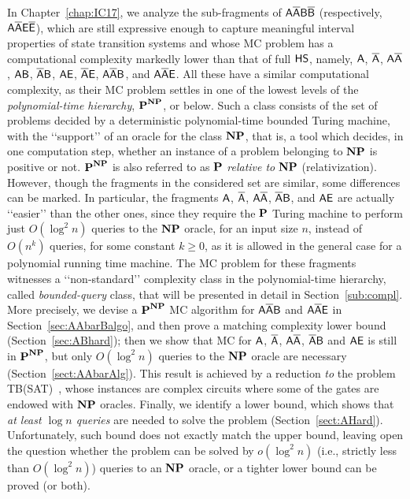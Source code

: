In Chapter~\ref{chap:IC17}, we analyze the sub-fragments of $\mathsf{A\overline{A}B\overline{B}}$ (respectively, $\mathsf{A\overline{A}E\overline{E}}$), which are still expressive enough to capture meaningful interval properties of state transition systems and whose MC problem has a computational complexity markedly lower than that of full $\text{\sffamily HS}$,
namely, $\mathsf{A}$, $\mathsf{\overline{A}}$, $\mathsf{A\overline{A}}$, $\mathsf{AB}$, $\mathsf{\overline{A}B}$, $\mathsf{AE}$, $\mathsf{\overline{A}E}$, $\mathsf{A\overline{A}B}$, and  $\mathsf{A\overline{A}E}$.
All these have a similar computational complexity, as their MC problem settles in one of the lowest levels of the \emph{polynomial-time hierarchy}, $\textbf{P}^{\textbf{NP}}$, or below. Such a class consists of the set of problems decided by a deterministic polynomial-time bounded Turing machine, with the \lq\lq support\rq\rq{} of an oracle for the class $\textbf{NP}$,
that is, a tool which decides, in one computation step, whether an instance of a problem belonging to $\textbf{NP}$ is positive or not. 
$\textbf{P}^{\textbf{NP}}$ is also referred to as $\textbf{P}$ \emph{relative to} $\textbf{NP}$ (relativization).
%
However, though the fragments in the considered set are similar, some differences can be marked. In particular, the fragments $\mathsf{A}$, $\mathsf{\overline{A}}$, $\mathsf{A\overline{A}}$, $\mathsf{\overline{A}B}$, and $\mathsf{AE}$ are actually \lq\lq easier\rq\rq{} than the other ones, since they require the $\textbf{P}$ Turing machine to perform just $O(\log^2 n)$ queries to the $\textbf{NP}$ oracle, for an input size $n$, instead of $O(n^k)$ queries, for some constant $k\geq 0$, as it is allowed in the general case for a  polynomial running time machine. The MC problem for these fragments witnesses
a \lq\lq non-standard\rq\rq{} complexity class in the polynomial-time hierarchy, called \emph{bounded-query} class, that will be presented in detail in Section~\ref{sub:compl}.
%
More precisely, 
we devise a $\textbf{P}^{\textbf{NP}}$ MC algorithm for $\mathsf{A\overline{A}B}$ and $\mathsf{A\overline{A}E}$ in Section~\ref{sec:AAbarBalgo}, and then prove a matching complexity lower bound (Section~\ref{sec:ABhard});
then we show that MC for $\mathsf{A}$, $\mathsf{\overline{A}}$, $\mathsf{A\overline{A}}$, $\mathsf{\overline{A}B}$ and $\mathsf{AE}$   
is still in $\textbf{P}^{\textbf{NP}}$, but only $O(\log^2 n)$ queries to the $\textbf{NP}$ oracle are necessary (Section~\ref{sect:AAbarAlg}).
This result is achieved by a reduction \emph{to} the problem TB(SAT)~\cite{schnoebelen2003}, whose instances are complex 
circuits where some of the gates are endowed with $\textbf{NP}$ oracles. 
Finally, we identify a lower bound, which shows that \emph{at least $\log n$ queries} are needed to solve the problem (Section~\ref{sect:AHard}). Unfortunately, such bound does not exactly match the upper bound, leaving open the question whether the problem can be solved by $o(\log^2 n)$ (i.e., strictly less than $O(\log^2 n)$) queries to an $\textbf{NP}$ oracle, or a tighter lower bound can be proved (or both).
 
